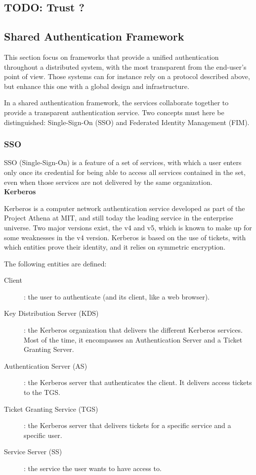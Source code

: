 \subsection{TODO: Trust ?}

\subsection{Shared Authentication Framework}
This section focus on frameworks that provide a unified authentication throughout a distributed system, with the most transparent from the end-user's point of view. Those systems can for instance rely on a protocol described above, but enhance this one with a global design and infrastructure. 

In a shared authentication framework, the services collaborate together to provide a transparent authentication service. Two concepts must here be distinguished: Single-Sign-On (SSO) and Federated Identity Management (FIM).

\subsubsection{SSO}
SSO (Single-Sign-On) is a feature of a set of services, with which a user enters only once its credential for being able to access all services contained in the set, even when those services are not delivered by the same organization.
\\
 
\quad \tabitem	\textbf{Kerberos}

\label{sec:02_Kerberos}
Kerberos\cite{Sundareswaran} is a computer network authentication service developed as part of the Project Athena at MIT, and still today the leading service in the enterprise universe. Two major versions exist, the v4 and v5, which is known to make up for some weaknesses in the v4 version. Kerberos is based on the use of tickets, with which entities prove their identity, and it relies on symmetric encryption.

The following entities are defined:
\begin{description}
	\item[Client]: the user to authenticate (and its client, like a web browser).
	\item[Key Distribution Server (KDS)]: the Kerberos organization that delivers the different Kerberos services. Most of the time, it encompasses an Authentication Server and a Ticket Granting Server.
	\item[Authentication Server (AS)]: the Kerberos server that authenticates the client. It delivers access tickets to the TGS.
	\item[Ticket Granting Service (TGS)]: the Kerberos server that delivers tickets for a specific service and a specific user.
	\item[Service Server (SS)]: the service the user wants to have access to. 
\end{description}

